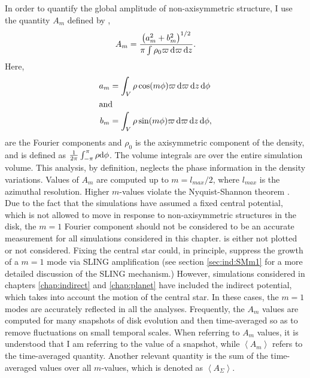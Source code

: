 In order to quantify the global amplitude of non-axisymmetric structure, I use the quantity $A_m$ defined by \citet{imamura2000},
\begin{equation}
A_m = \frac{\left (a_m^2 + b_m^2\right )^{1/2}}{\pi \int \rho_0 \varpi\, \mathrm{d} \varpi\, \mathrm{d} z}.
\label{eq:IC:am}
\end{equation}
Here,
\begin{subequations}\label{eq:IC:fourier}
\begin{align}
a_m&=\int_{V} \rho \cos (m\phi) \varpi\, \mathrm{d} \varpi \,\mathrm{d} z\, \mathrm{d} \phi \label{eq:IC:cos}\\
\intertext{and}
b_m&=\int_{V} \rho \sin (m\phi) \varpi \,\mathrm{d} \varpi\, \mathrm{d} z \,\mathrm{d} \phi, \label{eq:IC:sin}
\end{align}
\end{subequations} 
are the Fourier components and $\rho_0$ is the axisymmetric component of the density, and is defined as $\frac{1}{2\pi} \int_{-\pi}^{\pi} \rho \mathrm{d} \phi$. The volume integrals are over the entire simulation volume. This analysis, by definition, neglects the phase information in the density variations. Values of $A_m$ are computed up to $m = l_{max}/2$, where $l_{max}$ is the azimuthal resolution. Higher $m$-values violate the Nyquist-Shannon theorem \citep{shannon1984}. Due to the fact that the simulations have assumed a fixed central potential, which is not allowed to move in response to non-axisymmetric structures in the disk, the $m = 1$ Fourier component should not be considered to be an accurate measurement for all simulations considered in this chapter. is either not plotted or not considered. Fixing the central star could, in principle, suppress the growth of a $m = 1$ mode via SLING amplification (see section \ref{sec:ind:SMm1} for a more detailed discussion of the SLING mechanism.) However, simulations considered in chapters \ref{chap:indirect} and \ref{chap:planet} have included the indirect potential, which takes into account the motion of the central star. In these cases, the $m = 1$ modes are accurately reflected in all the analyses. Frequently, the $A_m$ values are computed for many snapshots of disk evolution and then time-averaged so as to remove fluctuations on small temporal scales. When referring to $A_m$ values, it is understood that I am referring to the value of a snapshot, while $\left< A_m \right>$ refers to the time-averaged quantity. Another relevant quantity is the sum of the time-averaged values over all $m$-values, which is denoted as $\left<A_\Sigma\right>$.

